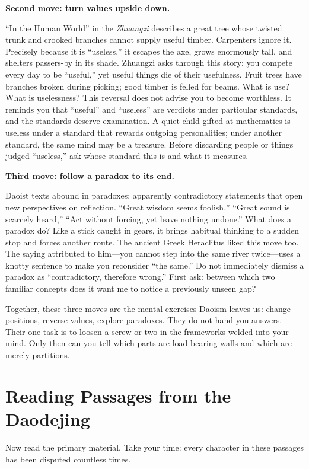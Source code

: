 \textbf{Second move: turn values upside down.}

``In the Human World'' in the \textit{Zhuangzi} describes a great tree whose twisted trunk and crooked branches cannot supply useful timber. Carpenters ignore it. Precisely because it is ``useless,'' it escapes the axe, grows enormously tall, and shelters passers-by in its shade. Zhuangzi asks through this story: you compete every day to be ``useful,'' yet useful things die of their usefulness. Fruit trees have branches broken during picking; good timber is felled for beams. What is use? What is uselessness? This reversal does not advise you to become worthless. It reminds you that ``useful'' and ``useless'' are verdicts under particular standards, and the standards deserve examination. A quiet child gifted at mathematics is useless under a standard that rewards outgoing personalities; under another standard, the same mind may be a treasure. Before discarding people or things judged ``useless,'' ask whose standard this is and what it measures.

\textbf{Third move: follow a paradox to its end.}

Daoist texts abound in paradoxes: apparently contradictory statements that open new perspectives on reflection. ``Great wisdom seems foolish,'' ``Great sound is scarcely heard,'' ``Act without forcing, yet leave nothing undone.'' What does a paradox do? Like a stick caught in gears, it brings habitual thinking to a sudden stop and forces another route. The ancient Greek Heraclitus liked this move too. The saying attributed to him---you cannot step into the same river twice---uses a knotty sentence to make you reconsider ``the same.'' Do not immediately dismiss a paradox as ``contradictory, therefore wrong.'' First ask: between which two familiar concepts does it want me to notice a previously unseen gap?

Together, these three moves are the mental exercises Daoism leaves us: change positions, reverse values, explore paradoxes. They do not hand you answers. Their one task is to loosen a screw or two in the frameworks welded into your mind. Only then can you tell which parts are load-bearing walls and which are merely partitions.

\section{Reading Passages from the Daodejing}
Now read the primary material. Take your time: every character in these passages has been disputed countless times.

